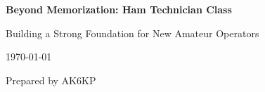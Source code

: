 \documentclass[12pt]{book}
\begin{document}
\begin{titlepage}
    \centering
    \vspace*{2cm}    
    {\Huge\bfseries Beyond Memorization: Ham Technician Class\par}
    \vspace{2cm}    
    {\Large Building a Strong Foundation for New Amateur Operators\par}
    
    \vspace{3cm}
    
    {\large\today\par}
    
    \vfill
    
    {\large Prepared by AK6KP\par}
\end{titlepage}

\cleardoublepage
\end{document}

